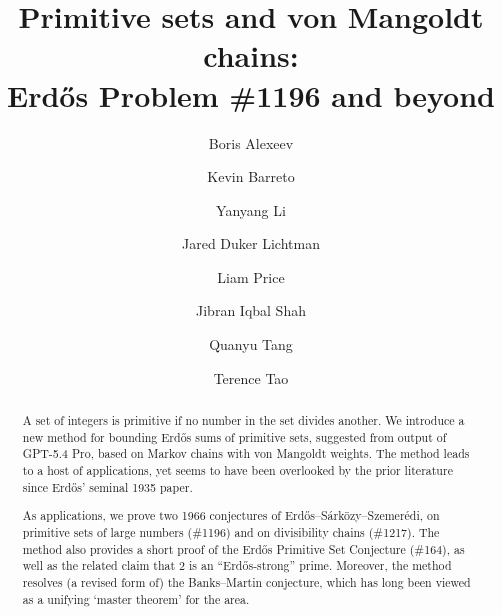 \documentclass[12pt]{amsart}
\theoremstyle{definition}
\theoremstyle{remark}
\numberwithin{equation}{section}
\newcommand{\1}{{\mathbf 1}}
\newcommand{\Erdos}{{Erd\H{o}s}}
\newcommand{\Sarkozy}{S\'{a}rk\"{o}zy} %
\newcommand{\Szemeredi}{Szemer\'edi}
\begin{document}
\title[Primitive sets and von Mangoldt chains]{Primitive sets and von Mangoldt chains:\\ Erd\H{o}s Problem \#1196 and beyond}

\author{Boris Alexeev}
\address{OpenAI, San Francisco, CA 94158}


\author{Kevin Barreto}
\address{Queens' College, University of Cambridge, Cambridge, CB3 9ET, United Kingdom}

\author{Yanyang Li}
\address{School of Mathematics, Southeast University, Nanjing 211189, P.~R.~China}

\author{Jared Duker Lichtman}
\address{
Department of Mathematics \\
450 Jane Stanford Way, Stanford, CA 94305-2125, USA
}

\author{Liam Price}

\author{Jibran Iqbal Shah}
\address{
Department of Mathematics \\
University of Toronto \\
Toronto, ON \\
Canada
}

\author{Quanyu Tang}
\address{School of Mathematics and Statistics, Xi'an Jiaotong University, Xi'an 710049, P.~R.~China}

\author{Terence Tao}
\address{Department of Mathematics \\
University of California, Los Angeles \\
Los Angeles, CA 90095 \\
USA}


\begin{abstract}
A set of integers is primitive if no number in the set divides another. We introduce a new method for bounding \Erdos{} sums of primitive sets, suggested from output of GPT-5.4 Pro, based on Markov chains with von Mangoldt weights. The method leads to a host of applications, yet seems to have been overlooked by the prior literature since \Erdos{}' seminal 1935 paper.


As applications, we prove two 1966 conjectures of \Erdos{}--\Sarkozy{}--\Szemeredi{}, on primitive sets of large numbers (\#1196) and on divisibility chains (\#1217). The method also provides a short proof of the \Erdos{} Primitive Set Conjecture (\#164), as well as the related claim that $2$ is an ``\Erdos{}-strong'' prime. Moreover, the method resolves (a revised form of) the Banks--Martin conjecture, which has long been viewed as a unifying `master theorem' for the area.
\end{abstract}
\maketitle
\end{document}
